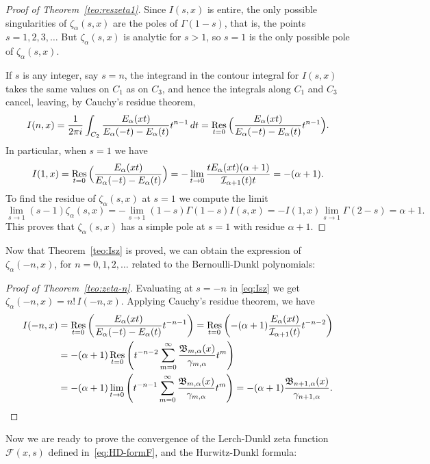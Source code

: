 \documentclass[a4paper]{amsart}
\newcommand{\I}{\mathcal{I}}
\newcommand{\Ea}{E_{\alpha}}
\newcommand{\B}{\mathfrak{B}}
\newcommand{\Res}{\operatornamewithlimits{Res}}
\theoremstyle{plain}
\theoremstyle{definition}
\theoremstyle{remark}
\numberwithin{equation}{section}
\begin{document}
\begin{proof}[Proof of Theorem~\ref{teo:reszeta1}]
Since $I(s,x)$ is entire, the only possible singularities of $\zeta_{\alpha}(s,x)$ are the poles of $\Gamma(1-s)$, that is, the points $s=1,2,3,\dots$ But $\zeta_{\alpha}(s,x)$ is analytic for $s>1$, so $s=1$ is the only possible pole of $\zeta_{\alpha}(s,x)$.

If $s$ is any integer, say $s=n$, the integrand in the contour integral for $I(s,x)$ takes the same values on $C_1$ as on $C_3$, and hence the integrals along $C_1$ and $C_3$ cancel, leaving, by Cauchy's residue theorem,
\[
I(n,x) = \frac{1}{2\pi i}\int_{C_2} \frac{\Ea(xt)}{\Ea(-t)-\Ea(t)} t^{n-1}\,dt = \Res_{t=0} \Big(\frac{\Ea(xt)}{\Ea(-t)-\Ea(t)} t^{n-1}\Big).
\]
In particular, when $s=1$ we have
\[
I(1,x) = \Res_{t=0} \Big(\frac{\Ea(xt)}{\Ea(-t)-\Ea(t)}\Big) 
= - \lim_{t\to 0} \frac{t \Ea(xt)(\alpha+1)}{\I_{\alpha+1}(t)t} = -(\alpha+1).
\]
To find the residue of $\zeta_{\alpha}(s,x)$ at $s=1$ we compute the limit
\[
\lim_{s\to 1}(s-1)\zeta_{\alpha}(s,x) 
= - \lim_{s\to 1}(1-s)\Gamma(1-s) I(s,x) 
= -I(1,x)\lim_{s\to 1}\Gamma(2-s) = \alpha+1.
\]
This proves that $\zeta_{\alpha}(s,x)$ has a simple pole at $s=1$ with residue $\alpha + 1$.
\end{proof}

Now that Theorem~\ref{teo:Isz} is proved, we can obtain the expression of 
$\zeta_\alpha(-n,x)$, for $n=0,1,2,\dots$ related to the Bernoulli-Dunkl polynomials:

\begin{proof}[Proof of Theorem~\ref{teo:zeta-n}]
Evaluating at $s=-n$ in \eqref{eq:Isz} we get $\zeta_\alpha(-n,x) = n!\,I(-n,x)$. Applying Cauchy's residue theorem, we have 
\begin{align*}
I(-n,x) & = \Res_{t=0} \left( \frac{\Ea(xt)}{\Ea(-t)-\Ea(t)}t^{-n-1}\right) 
 = \Res_{t=0} \left( -(\alpha+1)\frac{\Ea(xt)}{\I_{\alpha+1}(t)}t^{-n-2}\right) \\
 & =  -(\alpha+1)\Res_{t=0} \left(t^{-n-2} \sum_{m=0}^{\infty}
 \frac{\B_{m,\alpha}(x)}{\gamma_{m,\alpha}}t^m\right) \\
 & =  -(\alpha+1)\lim_{t\to 0} \left(t^{-n-1} \sum_{m=0}^{\infty} 
 \frac{\B_{m,\alpha}(x)}{\gamma_{m,\alpha}}t^m\right) 
 =  -(\alpha+1) \frac{\B_{n+1,\alpha}(x)}{\gamma_{n+1,\alpha}}.
\qedhere
\end{align*}
\end{proof}

Now we are ready to prove the convergence of the Lerch-Dunkl zeta function $\mathcal{F}(x,s)$ defined in~\eqref{eq:HD-formF}, and the Hurwitz-Dunkl formula:
\end{document}
